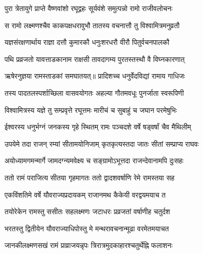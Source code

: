 
\vakta{}
\shrota{}
\tags{}
\notes{}

\storymeta





\twolineshloka
{पुरा त्रेतायुगे प्राप्ते वैष्णवांशो रघूद्वहः}
{सूर्यवंशे समुत्पन्नो रामो राजीवलोचनः}%

\twolineshloka
{स रामो लक्ष्मणश्चैव काकपक्षधरावुभौ}
{तातस्य वचनात्तौ तु विश्वामित्रमनुव्रतौ}%

\twolineshloka
{यज्ञसंरक्षणार्थाय राज्ञा दत्तौ कुमारकौ}
{धनुःशरधरौ वीरौ पितुर्वचनपालकौ}%

\twolineshloka
{पथि प्रव्रजतो यावत्ताडकानाम राक्षसी}
{तावदागम्य पुरतस्तस्थौ वै विघ्नकारणात्}%


\twolineshloka
{ऋषेरनुज्ञया रामस्ताडकां समघातयत्॥}
{प्रादिशच्च धनुर्वेदविद्यां रामाय गाधिजः}%

\twolineshloka
{तस्य पादतलस्पर्शाच्छिला वासवयोगतः}
{अहल्या गौतमवधूः पुनर्जाता स्वरूपिणी}%


\twolineshloka
{विश्वामित्रस्य यज्ञे तु सम्प्रवृत्ते रघूत्तमः}
{मारीचं च सुबाहुं च जघान परमेषुभिः}%

\twolineshloka
{ईश्वरस्य धनुर्भग्नं जनकस्य गृहे स्थितम्}
{रामः पञ्चदशे वर्षे षड्वर्षां चैव मैथिलीम्}%

\twolineshloka
{उपयेमे तदा राजन् रम्यां सीतामयोनिजाम्}
{कृतकृत्यस्तदा जातः सीतां सम्प्राप्य राघवः}%

\twolineshloka
{अयोध्यामगमन्मार्गे जामदग्न्यमवेक्ष्य च}
{सङ्ग्रामोऽभूत्तदा राजन्देवानामपि दुःसहः}%

\twolineshloka
{ततो रामं पराजित्य सीतया गृहमागतः}
{ततो द्वादशवर्षाणि रेमे रामस्तया सह}%

\twolineshloka
{एकविंशतिमे वर्षे यौवराज्यप्रदायकम्}
{राजानमथ कैकेयी वरद्वयमयाच त}%

\twolineshloka
{तयोरेकेन रामस्तु ससीतः सहलक्ष्मणः}
{जटाधरः प्रव्रजतां वर्षाणीह चतुर्दश}%

\twolineshloka
{भरतस्तु द्वितीयेन यौवराज्याधिपोस्तु मे}
{मन्थरावचनान्मूढा वरमेतमयाचत}%

\twolineshloka
{जानकीलक्ष्मणसखं रामं प्राव्राजयन्नृपः}
{त्रिरात्रमुदकाहारश्चतुर्थेह्नि फलाशनः}%

